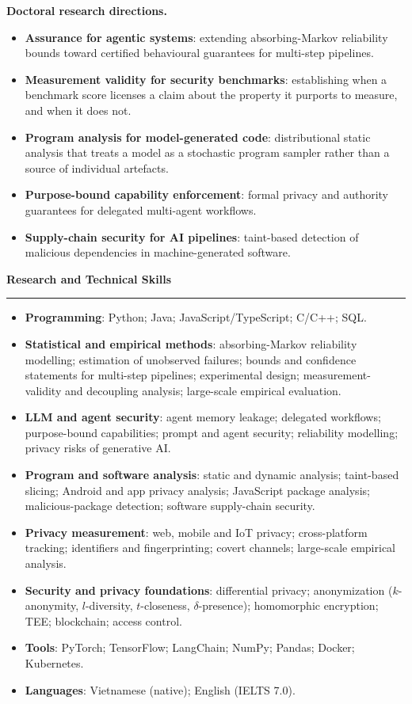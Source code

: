 \documentclass[11pt,a4paper]{article}
\newcommand{\sectiontitle}[1]{%
  \Needspace{5\baselineskip}
  \vspace{0.28cm}%
  {\Large\bfseries #1}\par\vspace{0.08cm}\hrule\vspace{0.18cm}%
}
\begin{document}
\vspace{0.12cm}
\noindent\textbf{Doctoral research directions.}
\begin{itemize}
  \item \textbf{Assurance for agentic systems}: extending absorbing-Markov reliability bounds toward certified behavioural guarantees for multi-step pipelines.
  \item \textbf{Measurement validity for security benchmarks}: establishing when a benchmark score licenses a claim about the property it purports to measure, and when it does not.
  \item \textbf{Program analysis for model-generated code}: distributional static analysis that treats a model as a stochastic program sampler rather than a source of individual artefacts.
  \item \textbf{Purpose-bound capability enforcement}: formal privacy and authority guarantees for delegated multi-agent workflows.
  \item \textbf{Supply-chain security for AI pipelines}: taint-based detection of malicious dependencies in machine-generated software.
\end{itemize}
\sectiontitle{Research and Technical Skills}
\begin{itemize}
  \item \textbf{Programming}: Python; Java; JavaScript/TypeScript; C/C++; SQL.
  \item \textbf{Statistical and empirical methods}: absorbing-Markov reliability modelling; estimation of unobserved failures; bounds and confidence statements for multi-step pipelines; experimental design; measurement-validity and decoupling analysis; large-scale empirical evaluation.
  \item \textbf{LLM and agent security}: agent memory leakage; delegated workflows; purpose-bound capabilities; prompt and agent security; reliability modelling; privacy risks of generative AI.
  \item \textbf{Program and software analysis}: static and dynamic analysis; taint-based slicing; Android and app privacy analysis; JavaScript package analysis; malicious-package detection; software supply-chain security.
  \item \textbf{Privacy measurement}: web, mobile and IoT privacy; cross-platform tracking; identifiers and fingerprinting; covert channels; large-scale empirical analysis.
  \item \textbf{Security and privacy foundations}: differential privacy; anonymization ($k$-anonymity, $l$-diversity, $t$-closeness, $\delta$-presence); homomorphic encryption; TEE; blockchain; access control.
  \item \textbf{Tools}: PyTorch; TensorFlow; LangChain; NumPy; Pandas; Docker; Kubernetes.
  \item \textbf{Languages}: Vietnamese (native); English (IELTS 7.0).
\end{itemize}
\end{document}
